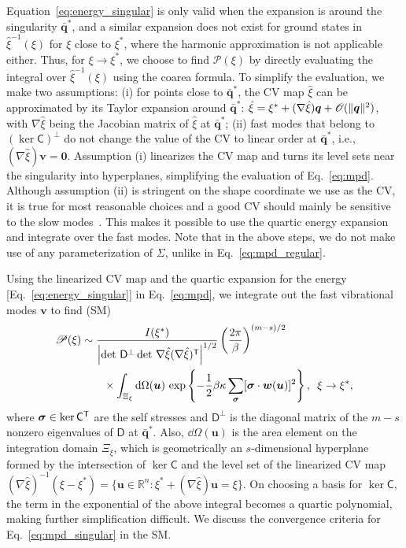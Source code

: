 Equation~\eqref{eq:energy_singular} is only valid when the expansion is around the singularity $\bar{\bm{q}}^{*}$, and a similar expansion does not exist for ground states in $\hat{\xi}^{-1}(\xi)$ for $\xi$ close to $\xi^{*}$, where the harmonic approximation is not applicable either.
Thus, for $\xi \to \xi^{*}$, we choose to find $\mathscr{P}(\xi)$ by directly evaluating the integral over $\hat{\xi}^{-1}(\xi)$ using the coarea formula.
To simplify the evaluation, we make two assumptions: (i) for points close to $\bar{\bm{q}}^{*}$, the CV map $\hat{\xi}$ can be approximated by its Taylor expansion around $\bar{\bm{q}}^{*}$: $\hat{\xi} = \xi^{*} + (\nabla\hat{\xi})\bm{q} + \mathscr{O}(\lVert\bm{q}\rVert^{2})$, with $\nabla\hat{\xi}$ being the Jacobian matrix of $\hat{\xi}$ at $\bar{\bm{q}}^{*}$; (ii) fast modes that belong to $(\ker\mathsf{C})^{\perp}$ do not change the value of the CV to linear order at $\bar{\bm{q}}^{*}$, i.e., $(\nabla\hat{\xi})\bm{v} = \bm{0}$.
Assumption (i) linearizes the CV map and turns its level sets near the singularity into hyperplanes, simplifying the evaluation of Eq.~\eqref{eq:mpd}.
Although assumption (ii) is stringent on the shape coordinate we use as the CV, it is true for most reasonable choices and a good CV should mainly be sensitive to the slow modes~\cite{tiwary2016}.
This makes it possible to use the quartic energy expansion and integrate over the fast modes.
Note that in the above steps, we do not make use of any parameterization of $\Sigma$, unlike in Eq.~\eqref{eq:mpd_regular}.

Using the linearized CV map and the quartic expansion for the energy [Eq.~\eqref{eq:energy_singular}] in Eq.~\eqref{eq:mpd}, we integrate out the fast vibrational modes $\bm{v}$ to find (SM)
%
\begin{equation}
  \begin{aligned}
    \mathscr{P}(\xi) &\sim \frac{I({\xi}^{*})}{\left|\det\,\mathsf{D}^\perp \det\,\nabla\hat{\xi}(\nabla\hat{\xi})^\mathsf{T}\right|^{1/2}}  \left(\frac{2\pi}{\beta}\right)^{(m-s)/2} \\
                                 &\qquad \times \int_{\Xi_{\xi}}\mathrm{d}\Omega(\bm{u})\, \exp\left\{-\frac{1}{2}\beta\kappa\sum_{\bm{\sigma}}[\bm{\sigma}\cdot\bm{w}(\bm{u})]^2\right\},\enspace \xi \to {\xi}^{*},
  \end{aligned}
  \label{eq:mpd_singular}
\end{equation}
%
where $\bm{\sigma} \in \ker\mathsf{C}^\mathsf{T}$ are the self stresses and $\mathsf{D}^{\perp}$ is the diagonal matrix of the $m-s$ nonzero eigenvalues of $\mathsf{D}$ at $\bar{\bm{q}}^{*}$.
Also, $\dd\Omega(\bm{u})$ is the area element on the integration domain $\Xi_{\xi}$, which is geometrically an $s$-dimensional hyperplane formed by the intersection of $\ker\mathsf{C}$ and the level set of the linearized CV map $(\nabla\hat{\xi})^{-1}(\xi - {\xi}^{*}) = \{\bm{u} \in \mathbb{R}^{n} : \xi^{*} + (\nabla\hat{\xi})\bm{u} = \xi\}$.
On choosing a basis for $\ker\mathsf{C}$, the term in the exponential of the above integral becomes a quartic polynomial, making further simplification difficult.
We discuss the convergence criteria for Eq.~\eqref{eq:mpd_singular} in the SM.

